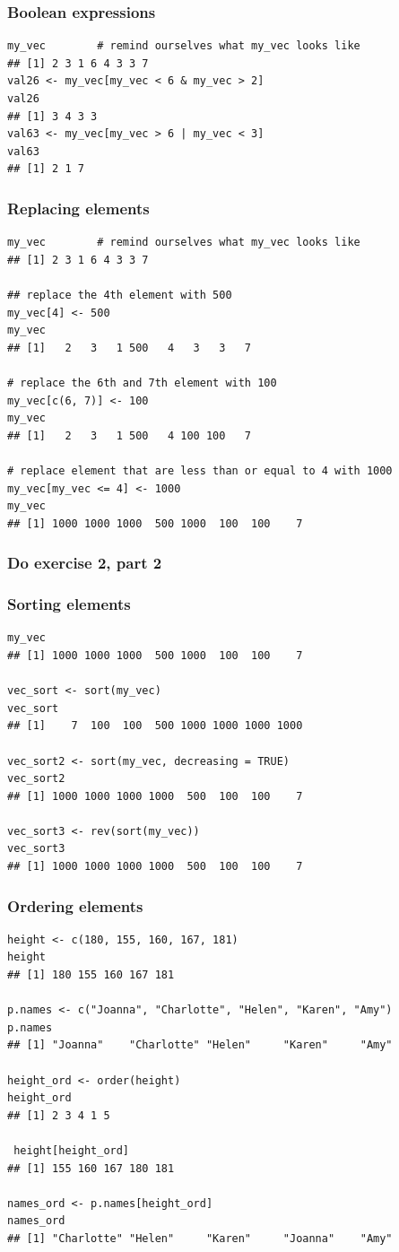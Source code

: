\documentclass{beamer}
\newcommand{\bfr}[1]{\begin{frame}[fragile]\frametitle{{ #1 }}}
\begin{document}
\bfr{Boolean expressions}

\begin{Verbatim}[frame=single]
my_vec        # remind ourselves what my_vec looks like
## [1] 2 3 1 6 4 3 3 7
val26 <- my_vec[my_vec < 6 & my_vec > 2]
val26
## [1] 3 4 3 3
val63 <- my_vec[my_vec > 6 | my_vec < 3]
val63
## [1] 2 1 7
\end{Verbatim}
\end{frame}


\bfr{Replacing elements}

\begin{verbatim}
my_vec        # remind ourselves what my_vec looks like
## [1] 2 3 1 6 4 3 3 7

## replace the 4th element with 500
my_vec[4] <- 500
my_vec
## [1]   2   3   1 500   4   3   3   7

# replace the 6th and 7th element with 100
my_vec[c(6, 7)] <- 100
my_vec
## [1]   2   3   1 500   4 100 100   7

# replace element that are less than or equal to 4 with 1000
my_vec[my_vec <= 4] <- 1000
my_vec
## [1] 1000 1000 1000  500 1000  100  100    7
\end{verbatim}
\end{frame}

\bfr{Do exercise 2, part 2}
\end{frame}

\bfr{Sorting elements}

\begin{verbatim}
my_vec
## [1] 1000 1000 1000  500 1000  100  100    7

vec_sort <- sort(my_vec)
vec_sort
## [1]    7  100  100  500 1000 1000 1000 1000

vec_sort2 <- sort(my_vec, decreasing = TRUE)
vec_sort2
## [1] 1000 1000 1000 1000  500  100  100    7

vec_sort3 <- rev(sort(my_vec))
vec_sort3
## [1] 1000 1000 1000 1000  500  100  100    7
\end{verbatim}
\end{frame}

\bfr{Ordering elements}

\begin{verbatim}
height <- c(180, 155, 160, 167, 181)
height
## [1] 180 155 160 167 181

p.names <- c("Joanna", "Charlotte", "Helen", "Karen", "Amy")
p.names
## [1] "Joanna"    "Charlotte" "Helen"     "Karen"     "Amy"

height_ord <- order(height)
height_ord
## [1] 2 3 4 1 5

 height[height_ord]
## [1] 155 160 167 180 181

names_ord <- p.names[height_ord]
names_ord
## [1] "Charlotte" "Helen"     "Karen"     "Joanna"    "Amy"
\end{verbatim}
\end{frame}
\end{document}
